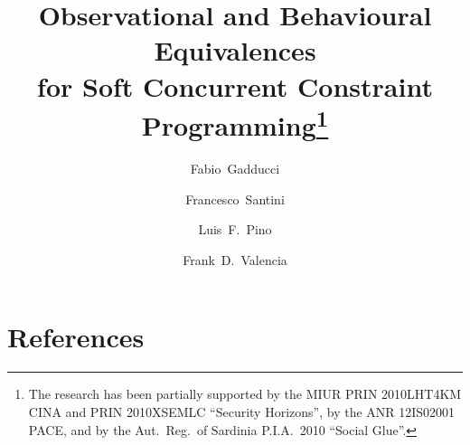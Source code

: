 \documentclass[preprint,12pt]{elsarticle}
\begin{document}
\begin{frontmatter}
\title{Observational and Behavioural Equivalences\\ for 
Soft Concurrent Constraint Programming\thanks{The research 
has been partially supported 
by the MIUR PRIN 2010LHT4KM CINA
and PRIN 2010XSEMLC ``Security Horizons'',
by the ANR 12IS02001 PACE, and 
by the Aut.\ Reg.\ of Sardinia P.I.A.\ 2010 ``Social Glue''.
}
}

\author[fb]{Fabio~Gadducci}
    \author[fs]{Francesco~Santini}
    \author[lp]{Luis~F.~Pino}
    \author[fv]{Frank~D.~Valencia}
 


\address[fb]{Dipartimento di Informatica, Universit\`a di Pisa, Italy} 
\address[fs]{Dipartimento di Matematica e Informatica, Universit\`a di Perugia, Italy}
\address[lp]{Dipartimento di Matematica e Informatica, Universit\`a di Cagliari, Italy}
\address[fv]{CNRS and LIX, \'{E}cole Polytechnique de Paris, France}

   
    

\end{frontmatter}




%

%




\section*{References} \label{}



%
\end{document}

